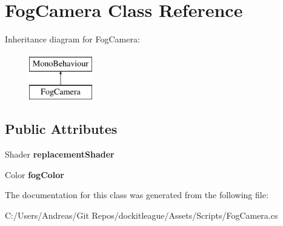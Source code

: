\hypertarget{class_fog_camera}{}\section{Fog\+Camera Class Reference}
\label{class_fog_camera}
Inheritance diagram for Fog\+Camera\+:\begin{figure}[H]
\begin{center}
\leavevmode
\includegraphics[height=2.000000cm]{class_fog_camera}
\end{center}
\end{figure}
\subsection*{Public Attributes}
\begin{DoxyCompactItemize}
\item 
\hypertarget{class_fog_camera_a4589c0e347ed28bffe69b52ad5530245}{}\label{class_fog_camera_a4589c0e347ed28bffe69b52ad5530245} 
Shader {\bfseries replacement\+Shader}
\item 
\hypertarget{class_fog_camera_ab6589d1d862bf689efbada6001eb20e8}{}\label{class_fog_camera_ab6589d1d862bf689efbada6001eb20e8} 
Color {\bfseries fog\+Color}
\end{DoxyCompactItemize}


The documentation for this class was generated from the following file\+:\begin{DoxyCompactItemize}
\item 
C\+:/\+Users/\+Andreas/\+Git Repos/dockitleague/\+Assets/\+Scripts/Fog\+Camera.\+cs\end{DoxyCompactItemize}
